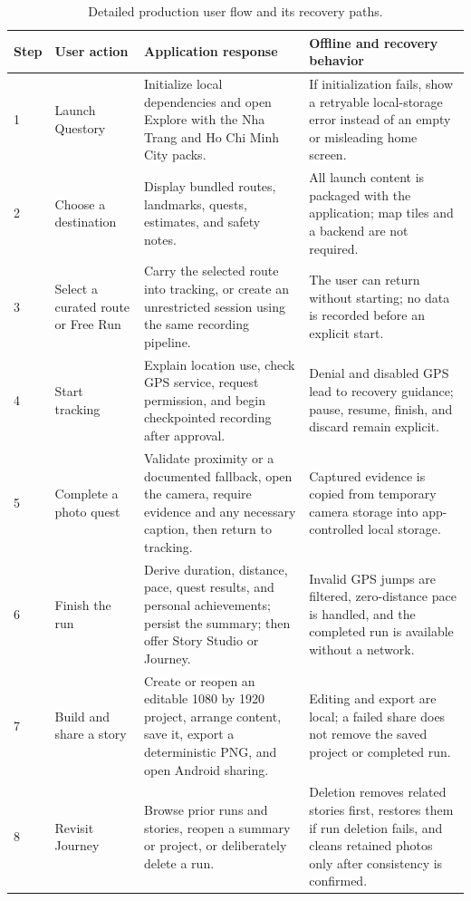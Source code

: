 \begin{table}[htbp]
\centering
\footnotesize
\begin{tabularx}{\textwidth}{@{}p{7mm}p{31mm}p{52mm}X@{}}
\toprule
\textbf{Step} & \textbf{User action} & \textbf{Application response} &
\textbf{Offline and recovery behavior} \\
\midrule
1 & Launch Questory & Initialize local dependencies and open Explore with the
Nha Trang and Ho Chi Minh City packs. & If initialization fails, show a retryable
local-storage error instead of an empty or misleading home screen. \\
2 & Choose a destination & Display bundled routes, landmarks, quests, estimates,
and safety notes. & All launch content is packaged with the application; map tiles
and a backend are not required. \\
3 & Select a curated route or Free Run & Carry the selected route into tracking,
or create an unrestricted session using the same recording pipeline. & The user
can return without starting; no data is recorded before an explicit start. \\
4 & Start tracking & Explain location use, check GPS service, request permission,
and begin checkpointed recording after approval. & Denial and disabled GPS lead
to recovery guidance; pause, resume, finish, and discard remain explicit. \\
5 & Complete a photo quest & Validate proximity or a documented fallback, open
the camera, require evidence and any necessary caption, then return to tracking.
& Captured evidence is copied from temporary camera storage into app-controlled
local storage. \\
6 & Finish the run & Derive duration, distance, pace, quest results, and personal
achievements; persist the summary; then offer Story Studio or Journey. & Invalid
GPS jumps are filtered, zero-distance pace is handled, and the completed run is
available without a network. \\
7 & Build and share a story & Create or reopen an editable 1080 by 1920 project,
arrange content, save it, export a deterministic PNG, and open Android sharing.
& Editing and export are local; a failed share does not remove the saved project
or completed run. \\
8 & Revisit Journey & Browse prior runs and stories, reopen a summary or project,
or deliberately delete a run. & Deletion removes related stories first, restores
them if run deletion fails, and cleans retained photos only after consistency is
confirmed. \\
\bottomrule
\end{tabularx}
\caption{Detailed production user flow and its recovery paths.}
\end{table}
